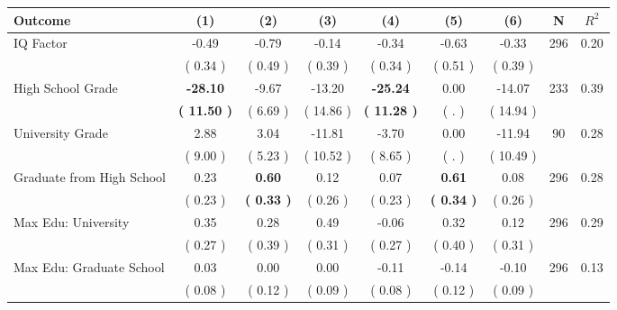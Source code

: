 \begin{tabular}{lcccccccc}
\toprule
 \textbf{Outcome} & \textbf{(1)} & \textbf{(2)} & \textbf{(3)} & \textbf{(4)} & \textbf{(5)} & \textbf{(6)} & \textbf{N} & \textbf{$ R^2$} \\
\midrule
IQ Factor &     -0.49 &     -0.79 &     -0.14 &     -0.34 &     -0.63 &     -0.33 & 296 &       0.20 \\ 
 & (     0.34 ) & (     0.49 ) & (     0.39 ) & (     0.34 ) & (     0.51 ) & (     0.39 ) & \\
High School Grade & \textbf{   -28.10} &     -9.67 &    -13.20 & \textbf{   -25.24} &      0.00 &    -14.07 & 233 &       0.39 \\ 
 & \textbf{(    11.50 )} & (     6.69 ) & (    14.86 ) & \textbf{(    11.28 )} & (        . ) & (    14.94 ) & \\
University Grade &      2.88 &      3.04 &    -11.81 &     -3.70 &      0.00 &    -11.94 & 90 &       0.28 \\ 
 & (     9.00 ) & (     5.23 ) & (    10.52 ) & (     8.65 ) & (        . ) & (    10.49 ) & \\
Graduate from High School &      0.23 & \textbf{     0.60} &      0.12 &      0.07 & \textbf{     0.61} &      0.08 & 296 &       0.28 \\ 
 & (     0.23 ) & \textbf{(     0.33 )} & (     0.26 ) & (     0.23 ) & \textbf{(     0.34 )} & (     0.26 ) & \\
Max Edu: University &      0.35 &      0.28 &      0.49 &     -0.06 &      0.32 &      0.12 & 296 &       0.29 \\ 
 & (     0.27 ) & (     0.39 ) & (     0.31 ) & (     0.27 ) & (     0.40 ) & (     0.31 ) & \\
Max Edu: Graduate School &      0.03 &      0.00 &      0.00 &     -0.11 &     -0.14 &     -0.10 & 296 &       0.13 \\ 
 & (     0.08 ) & (     0.12 ) & (     0.09 ) & (     0.08 ) & (     0.12 ) & (     0.09 ) & \\
\bottomrule
\end{tabular}
